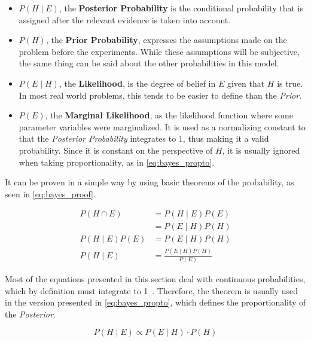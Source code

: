 \begin{itemize}
	\item $P \left( H \mid E \right)$, the \textbf{Posterior Probability} is the conditional probability that is assigned after the relevant evidence is taken into account.
	\item $P \left( H \right)$, the \textbf{Prior Probability}, expresses the assumptions made on the problem before the experiments. While these assumptions will be subjective, the same thing can be said about the other probabilities in this model.
	\item $P \left( E \mid H \right)$, the \textbf{Likelihood}, is the degree of belief in $E$ given that $H$ is true. In most real world problems, this tends to be easier to define than the \emph{Prior}.
	\item $P \left( E \right)$, the \textbf{Marginal Likelihood}, as the likelihood function where some parameter variables were marginalized. It is used as a normalizing constant to that the \emph{Posterior Probability} integrates to 1, thus making it a valid probability. Since it is constant on the perspective of $H$, it is usually ignored when taking proportionality, as in \cref{eq:bayes_propto}.
\end{itemize}

It can be proven in a simple way by using basic theorems of the probability, as seen in \cref{eq:bayes_proof}.

\begin{equation}
\label{eq:bayes_proof}
\begin{aligned}
	P \left( H \cap E \right)
	&= P \left( H \mid E \right)P \left( E \right) \\
	&= P \left( E \mid H \right)P \left( H \right) \\
	P \left( H \mid E \right) P \left( E \right) &= P \left( E \mid H \right) P \left( H \right) \\
	P \left( H \mid E \right) &= \frac{P \left( E \mid H \right) P \left( H \right)}{P \left( E \right)}
\end{aligned}
\end{equation}

Most of the equations presented in this section deal with continuous probabilities, which by definition must integrate to 1~\cite{kolmogrov1956}. Therefore, the theorem is usually used in the version presented in \cref{eq:bayes_propto}, which defines the proportionality of the \emph{Posterior}.

\begin{equation}
\label{eq:bayes_propto}
	P \left( H \mid E \right) \propto P \left( E \mid H \right) \cdot P \left( H \right)
\end{equation}

